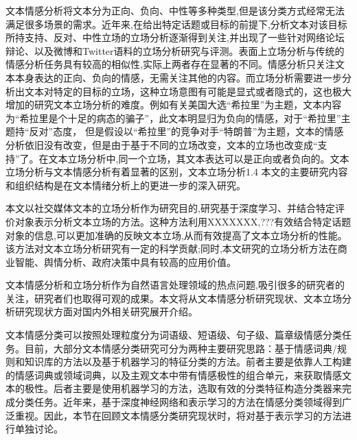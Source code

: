 文本情感分析将文本分为正向、负向、中性等多种类型,但是该分类方式经常无法满足很多场景的需求。近年来,在给出特定话题或目标的前提下,分析文本对该目标所持支持、反对、中性立场的立场分析逐渐得到关注,并出现了一些针对网络论坛辩论、以及微博和Twitter语料的立场分析研究与评测。表面上立场分析与传统的情感分析任务具有较高的相似性,实际上两者存在显著的不同。情感分析只关注文本本身表达的正向、负向的情感，无需关注其他的内容。而立场分析需要进一步分析出文本对特定的目标的立场，这种立场意图有可能是显式或者隐式的，这也极大增加的研究文本立场分析的难度。例如有关美国大选“希拉里”为主题，文本内容为“希拉里是个十足的病态的骗子”，此文本明显归为负向的情感，对于“希拉里”主题持“反对”态度， 但是假设以“希拉里”的竞争对手“特朗普”为主题，文本的情感分析依旧没有改变，但是由于基于不同的立场改变，文本的立场也改变成“支持”了。在文本立场分析中,同一个立场，其文本表达可以是正向或者负向的。文本立场分析与文本情感分析有着显著的区别，文本立场分析1.4 本文的主要研究内容和组织结构是在文本情绪分析上的更进一步的深入研究。

本文以社交媒体文本的立场分析作为研究目的,研究基于深度学习、并结合特定评价对象表示分析文本立场的方法。这种方法利用XXXXXXX,???有效结合特定话题对象的信息,可以更加准确的反映文本立场,从而有效提高了文本立场分析的性能。该方法对文本立场分析研究有一定的科学贡献;同时,本文研究的立场分析方法在商业智能、舆情分析、政府决策中具有较高的应用价值。



文本情感分析和立场分析作为自然语言处理领域的热点问题,吸引很多的研究者的关注，研究者们也取得可观的成果。本文将从文本情感分析研究现状、文本立场分析研究现状方面对国内外相关研究展开介绍。



文本情感分类可以按照处理粒度分为词语级、短语级、句子级、篇章级情感分类任务。目前，大部分文本情感分类研究可分为两种主要研究思路：基于情感词典/规则和知识库的方法以及基于机器学习的特征分类的方法。前者主要是依靠人工构建的情感词典或领域词典，以及主观文本中带有情感极性的组合单元，来获取情感文本的极性。后者主要是使用机器学习的方法，选取有效的分类特征构造分类器来完成分类任务。近年来，基于深度神经网络和表示学习的方法在情感分类领域得到广泛重视。因此，本节在回顾文本情感分类研究现状时，将对基于表示学习的方法进行单独讨论。

